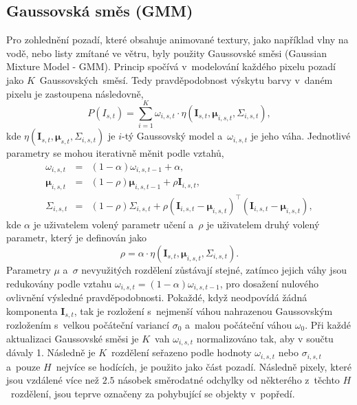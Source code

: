 \subsection{Gaussovská směs (GMM)}
\label{sec:BS_teorie_GMM}

\par{Pro zohlednění pozadí, které obsahuje animované textury, jako například vlny na vodě, nebo listy zmítané ve větru, byly použity Gaussovské směsi (Gaussian Mixture Model - GMM). Princip spočívá v~modelování každého pixelu pozadí jako $K$~Gaussovských~směsí. Tedy pravděpodobnost výskytu barvy v~daném pixelu je zastoupena následovně,
\begin{equation}
	P \left( I_{s, t} \right) = \sum_{i=1}^{K} \omega_{i, s, t} \cdot \eta \left( \bm{I}_{s, t}, \bm{\mu}_{i, s, t}, \Sigma_{i, s, t} \right),
\end{equation}
kde $\eta \left( \bm{I}_{s, t}, \bm{\mu}_{s, t}, \Sigma_{i, s, t} \right)$ je $i$-tý Gaussovský model a~$\omega_{i, s, t}$ je jeho váha. Jednotlivé parametry se mohou iterativně měnit podle vztahů,
\begin{eqnarray}
	\omega_{i, s, t} &= &(1 - \alpha) \omega_{i, s, t-1} + \alpha, \\
	\bm{\mu}_{i, s, t} &= &(1 - \rho) \bm{\mu}_{i, s, t-1} + \rho \bm{I}_{i, s, t}, \\
	\Sigma_{i, s, t} &= &(1 - \rho) \Sigma_{i, s, t} + \rho \left( \bm{I}_{i, s, t} - \bm{\mu}_{i, s, t} \right)^{\top} \left( \bm{I}_{i, s, t} - \bm{\mu}_{i, s, t} \right) ,
\end{eqnarray}
kde $\alpha$ je uživatelem volený parametr učení a~$\rho$ je uživatelem druhý volený parametr, který je definován jako
\begin{equation}
	\rho = \alpha \cdot \eta \left( \bm{I}_{s, t}, \bm{\mu}_{i, s, t}, \Sigma_{i, s, t} \right).
\end{equation}
Parametry $\mu$ a~$\sigma$ nevyužitých rozdělení zůstávají stejné, zatímco jejich váhy jsou redukovány podle vztahu $\omega_{i, s, t} = \left( 1 - \alpha \right) \omega_{i, s, t-1}$, pro dosažení nulového ovlivnění výsledné pravděpodobnosti. Pokaždé, když neodpovídá žádná komponenta $\bm{I}_{s, t}$, tak je rozložení s~nejmenší váhou nahrazenou Gaussovským rozložením s~velkou počáteční variancí $\sigma_0$ a~malou po\-čá\-teč\-ní váhou $\omega_0$. Při každé aktualizaci Gaussovské směsi je $K$~vah $\omega_{i, s, t}$ normalizováno tak, aby v součtu dávaly 1. Následně je $K$~rozdělení seřazeno podle hodnoty $\omega_{i, s , t}$ nebo $\sigma_{i, s, t}$ a~pouze $H$~nejvíce se hodících, je použito jako část pozadí. Následně pixely, které jsou vzdálené více než $2.5$ násobek směrodatné odchylky od některého z~těchto $H$~rozdělení, jsou teprve označeny za pohybující se objekty v~popředí.}

